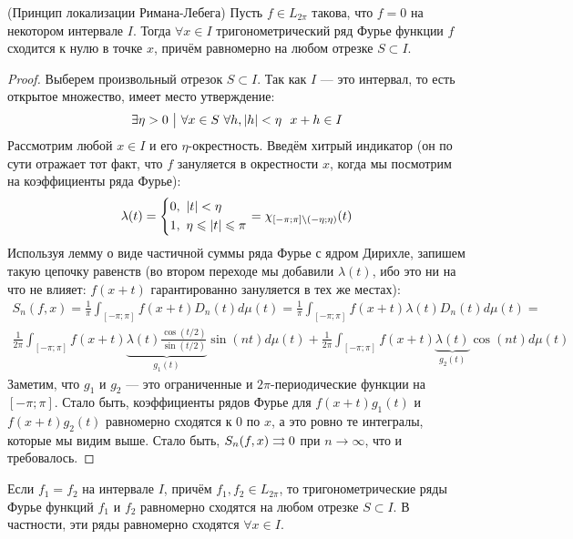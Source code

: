 \begin{theorem} (Принцип локализации Римана-Лебега)
	Пусть $f \in L_{2\pi}$ такова, что $f = 0$ на некотором интервале $I$. Тогда $\forall x \in I$ тригонометрический ряд Фурье функции $f$ сходится к нулю в точке $x$, причём равномерно на любом отрезке $S \subset I$.
\end{theorem}

\begin{proof}
	Выберем произвольный отрезок $S \subset I$. Так как $I$ --- это интервал, то есть открытое множество, имеет место утверждение:
	\[
		\exists \eta > 0 \such \forall x \in S\ \forall h, |h| < \eta\ \ x + h \in I
	\]
	Рассмотрим любой $x \in I$ и его $\eta$-окрестность. Введём хитрый индикатор (он по сути отражает тот факт, что $f$ зануляется в окрестности $x$, когда мы посмотрим на коэффициенты ряда Фурье):
	\[
		\lambda(t) = \left\{ \begin{aligned} 
			&{0,\ |t| < \eta}
			\\
			&{1,\ \eta \leqslant |t| \leqslant \pi}
		 \end{aligned} \right.
		= \chi_{[-\pi; \pi] \backslash (-\eta; \eta)}(t)
	\]
	Используя лемму о виде частичной суммы ряда Фурье с ядром Дирихле, запишем такую цепочку равенств (во втором переходе мы добавили $\lambda(t)$, ибо это ни на что не влияет: $f(x + t)$ гарантированно зануляется в тех же местах):
	\begin{multline*}
		S_n(f, x) = \frac{1}{\pi} \int_{[-\pi; \pi]} f(x + t)D_n(t)d\mu(t) = \frac{1}{\pi} \int_{[-\pi; \pi]} f(x + t)\lambda(t)D_n(t)d\mu(t) =
		\\
		\frac{1}{2\pi} \int_{[-\pi; \pi]} f(x + t)\underbrace{\lambda(t) \frac{\cos(t / 2)}{\sin(t / 2)}}_{g_1(t)}\sin(nt)d\mu(t) + \frac{1}{2\pi} \int_{[-\pi; \pi]} f(x + t)\underbrace{\lambda(t)}_{g_2(t)}\cos(nt)d\mu(t)
	\end{multline*}
	Заметим, что $g_1$ и $g_2$ --- это ограниченные и $2\pi$-периодические функции на $[-\pi; \pi]$. Стало быть, коэффициенты рядов Фурье для $f(x + t)g_1(t)$ и $f(x + t)g_2(t)$ равномерно сходятся к 0 по $x$, а это ровно те интегралы, которые мы видим выше. Стало быть, $S_n(f, x) \rightrightarrows 0$ при $n \to \infty$, что и требовалось.
\end{proof}

\begin{corollary}
	Если $f_1 = f_2$ на интервале $I$, причём $f_1, f_2 \in L_{2\pi}$, то тригонометрические ряды Фурье функций $f_1$ и $f_2$ равномерно сходятся на любом отрезке $S \subset I$. В частности, эти ряды равномерно сходятся $\forall x \in I$.
\end{corollary}

